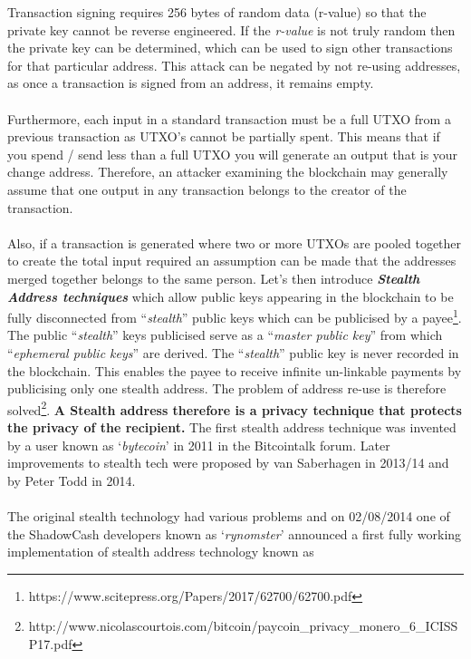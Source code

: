 Transaction signing requires 256 bytes of random data (r-value) so that the
private key cannot be reverse engineered. If the \textit{r-value} is not truly random
then the private key can be determined, which can be used to sign other
transactions for that particular address. This attack can be negated by
not re-using addresses, as once a transaction is signed from an address,
it remains empty.
\\
\\
\noindent
Furthermore, each input in a standard transaction must be a full UTXO
from a previous transaction as UTXO’s cannot be partially spent. This
means that if you spend / send less than a full UTXO you will generate
an output that is your change address. Therefore, an attacker examining
the blockchain may generally assume that one output in any transaction
belongs to the creator of the transaction.
\\
\\
\noindent
Also, if a transaction is generated where two or more UTXOs are pooled
together to create the total input required an assumption can be made
that the addresses merged together belongs to the same person.
\newpage
\noindent
Let’s then introduce \textbf{\textit{Stealth Address techniques}} which 
allow public keys appearing in the blockchain to be fully disconnected 
from “\textit{stealth}” public keys which can be publicised by a 
payee\footnote{https://www.scitepress.org/Papers/2017/62700/62700.pdf}. 
The public “\textit{stealth}” keys publicised serve as a 
“\textit{master public key}” from which “\textit{ephemeral public
keys}” are derived. The “\textit{stealth}” public key is never recorded in the
blockchain. This enables the payee to receive infinite un-linkable
payments by publicising only one stealth address. The problem of address
re-use is therefore 
solved\footnote{http://www.nicolascourtois.com/bitcoin/paycoin\_privacy\_monero\_6\_ICISSP17.pdf}. 
\textbf{A Stealth address therefore is a privacy technique that protects 
the privacy of the recipient.} The first stealth address technique was 
invented by a user known as ‘\textit{bytecoin}’ in 2011 in the Bitcointalk 
forum. Later improvements to stealth tech were proposed by van Saberhagen 
in 2013/14 and by Peter Todd in 2014.
\\
\\
\noindent
The original stealth technology had various problems and on 02/08/2014 one
of the ShadowCash developers known as ‘\textit{rynomster}’ announced a 
first fully working implementation of stealth address technology known as 
